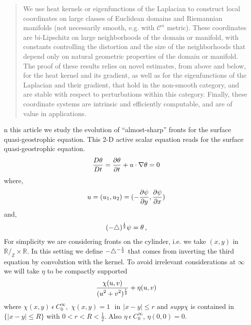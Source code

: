 \documentclass{pnastwo}
\begin{document}
\begin{article}
\begin{abstract}
{We use heat kernels or eigenfunctions of the Laplacian to construct
local coordinates on large classes of Euclidean domains and Riemannian
manifolds (not necessarily smooth, e.g. with $\mathcal{C}^\alpha$
metric). These coordinates are bi-Lipschitz on large neighborhoods of
the domain or manifold, with  constants controlling the distortion and
the size of the neighborhoods that depend only on natural geometric
properties of the domain or manifold. The proof of these results relies
on novel estimates, from above and below, for the heat kernel and its
gradient, as well as for the eigenfunctions of the Laplacian and their
gradient, that hold in the non-smooth category, and are stable with
respect to perturbations within this category. Finally, these coordinate
systems are intrinsic and efficiently computable, and are of value in
applications.}
\end{abstract}



n this article we study the evolution of ``almost-sharp'' fronts
for the surface quasi-geostrophic equation. This 2-D active scalar
equation reads for the surface quasi-geostrophic equation.
\begin{equation}
\mfrac{D \theta}{Dt}=\mfrac{\pr \theta}{\pr t} + u\cdot \nabla
\theta=0 \label{qg1}
\end{equation}
where,
\begin{equation}
 u=(u_1,u_2)=(-\mfrac{\pr \psi}{\pr y},\mfrac{\pr \psi}{\pr
x})\label{qg2} \end{equation}
and,
\begin{equation} (-\triangle)^{\f12}\psi=\theta \, ,\label{qg3} \end{equation}
For simplicity we are considering fronts on the cylinder, i.e. we
take $(x,y)$ in $\mathbb{R}/_{\displaystyle{\mathbb{Z}}}\times
\mathbb{R}$. In this setting we define $-\triangle^{-\f12}$ that
comes from inverting the third equation by convolution with the
kernel. To avoid irrelevant considerations at $\infty$ we
will take $\eta$ to be compactly supported
\[
\mfrac{\chi(u,v)}{(u^2+v^2)^{\f12}}+\eta(u,v)
\]
where $\chi (x,y)\ \epsilon\ C^{\infty}_{0},\,\,
\chi(x,y)=1 \hspace{8pt} \mbox{in} \hspace{5pt} |x-y|\leq r \,\,
\mbox{and}\,\, supp \chi$ is contained in $  \{|x-y|\leq R\} $
with $0<r<R<\frac{1}{2}$. Also $ \eta\ \epsilon\ C^{\infty}_0$,
$\eta(0,0)=0 $.


\end{article}
\end{document}
